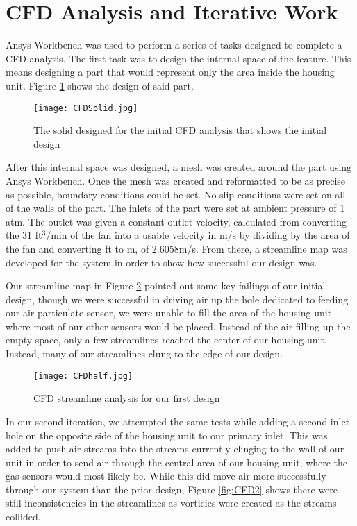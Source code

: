 \section{CFD Analysis and Iterative Work}

Ansys Workbench was used to perform a series of tasks designed to complete a CFD analysis. The first task was to design the internal space of the feature. This means designing a part that would represent only the area inside the housing unit. Figure \ref{fig:intspace} shows the design of said part.

\begin{figure}[H]
	\centering
	\texttt{[image: CFDSolid.jpg]}
	\caption{The solid designed for the initial CFD analysis that shows the initial design}
	\label{fig:intspace}
\end{figure}

After this internal space was designed, a mesh was created around the part using Ansys Workbench. Once the mesh was created and reformatted to be as precise as possible, boundary conditions could be set. No-slip conditions were set on all of the walls of the part. The inlets of the part were set at ambient pressure of 1 atm. The outlet was given a constant outlet velocity, calculated from converting the 31 ft$^{3}$/min of the fan into a usable velocity in m/s by dividing by the area of the fan and converting ft to m, of 2.6058m/s. From there, a streamline map was developed for the system in order to show how successful our design was.

Our streamline map in Figure \ref{fig:CFD1} pointed out some key failings of our initial design, though we were successful in driving air up the hole dedicated to feeding our air particulate sensor, we were unable to fill the area of the housing unit where most of our other sensors would be placed. Instead of the air filling up the empty space, only a few streamlines reached the center of our housing unit. Instead, many of our streamlines clung to the edge of our design.

\begin{figure}[H]
	\centering
	\texttt{[image: CFDhalf.jpg]}
	\caption{CFD streamline analysis for our first design}
	\label{fig:CFD1}
\end{figure}

In our second iteration, we attempted the same tests while adding a second inlet hole on the opposite side of the housing unit to our primary inlet. This was added to push air streams into the streams currently clinging to the wall of our unit in order to send air through the central area of our housing unit, where the gas sensors would most likely be. While this did move air more successfully through our system than the prior design, Figure \ref{fig:CFD2} shows there were still inconsistencies in the streamlines as vorticies were created as the streams collided.

